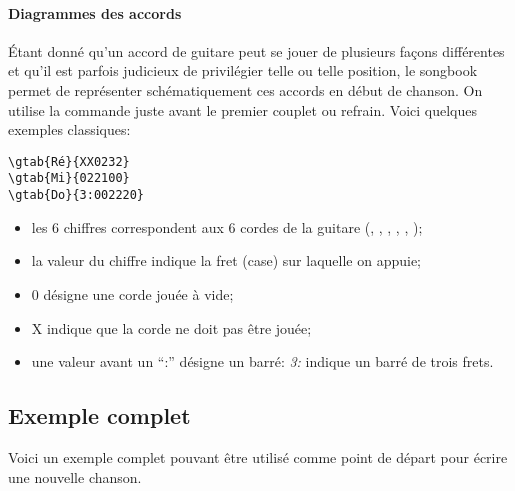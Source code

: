 \documentclass[versionenligne]{patacrep}
\begin{document}
\paragraph{Diagrammes des accords}
Étant donné qu'un accord de guitare peut se jouer de plusieurs façons
différentes et qu'il est parfois judicieux de privilégier telle ou
telle position, le songbook permet de représenter schématiquement ces
accords en début de chanson. On utilise la commande 
juste avant le premier couplet ou refrain. Voici quelques exemples
classiques:

\begin{verbatim}
\gtab{Ré}{XX0232}
\gtab{Mi}{022100}
\gtab{Do}{3:002220}
\end{verbatim}

\begin{itemize}
\item les 6 chiffres correspondent aux 6 cordes de la guitare
  (, , , ,
  , );
\item la valeur du chiffre indique la fret (case) sur laquelle on
  appuie;
\item 0 désigne une corde jouée à vide;
\item X indique que la corde ne doit pas être jouée;
\item une valeur avant un ``:'' désigne un barré: \emph{3:} indique un
  barré de trois frets.
\end{itemize}

\subsection{Exemple complet}

Voici un exemple complet pouvant être utilisé comme point de départ
pour écrire une nouvelle chanson.
\end{document}
